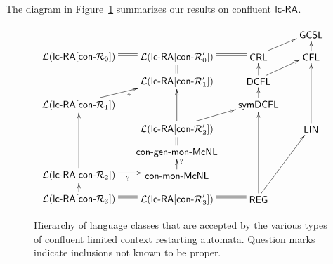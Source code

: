 The diagram in Figure~\ref{Fig2} summarizes our results on confluent $\lcRA$.

\begin{figure}
{\small
\[ \xymatrix@R8pt@C15pt{
                              &                      &                   & \txt{\sf GCSL}\\
\txt{${\mathcal L}(\textup{\sf lc-RA}[\textup{\sf con-{$\mathcal R$}}_0])$}\ar@{=}[r] &
\txt{${\mathcal L}(\textup{\sf lc-RA}[\textup{\sf con-{$\mathcal R$}}_0'])$}\ar@{=}[r] &
\txt{\sf CRL}\ar@{->}[ur] & \txt{\sf CFL}\ar@{->}[u]\\
       &  \txt{${\mathcal L}(\textup{\sf lc-RA}[\textup{\sf con-{$\mathcal R$}}_1'])$}\ar@{=}[u] &
\txt{\sf DCFL}\ar@{->}[u]\ar@{->}[ur] \\
     \txt{${\mathcal L}(\textup{\sf lc-RA}[\textup{\sf con-{$\mathcal R$}}_1])$} \ar@{->}_?[ur]  &  &
\txt{\sf symDCFL}\ar@{->}[u]\\
      & \txt{${\mathcal L}(\textup{\sf lc-RA}[\textup{\sf con-{$\mathcal R$}}_2'])$}\ar@{->}[ur]\ar@{->}[uu]
& & \txt{\sf LIN}\ar@{->}[uuu]\\
             & \txt{$\textup{\sf con-gen-mon-McNL}$}\ar@{=}[u]\\
\txt{${\mathcal L}(\textup{\sf lc-RA}[\textup{\sf con-{$\mathcal R$}}_2])$}\ar@{->}_?[r]\ar@{->}[uuu]&
                  \txt{$\textup{\sf con-mon-McNL}$}\ar@{->}_?[u]  \\
\txt{${\mathcal L}(\textup{\sf lc-RA}[\textup{\sf con-{$\mathcal R$}}_3])$}\ar@{=}[r]\ar@{->}[u] &
\txt{${\mathcal L}(\textup{\sf lc-RA}[\textup{\sf con-{$\mathcal R$}}_3'])$}\ar@{=}[r] & \txt{\sf REG}\ar@{->}[uuuu]\ar@{->}[uuur]\\
}
\]
\caption{Hierarchy of language classes that are accepted by the various types of confluent limited context restarting automata. Question marks indicate inclusions not known to be proper.}\label{Fig2}
}
\end{figure}
